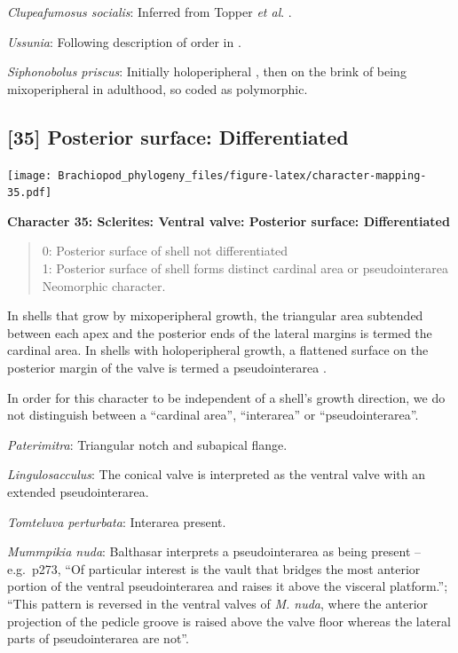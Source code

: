 \documentclass[openany]{book}
\theoremstyle{definition}
\theoremstyle{definition}
\theoremstyle{definition}
\theoremstyle{remark}
\begin{document}
\emph{Clupeafumosus socialis}: Inferred from Topper \emph{et al}.
\citeyearpar{Topper2013Reappraisalof}.

\emph{Ussunia}: Following description of order in
\citet{Williams2000BrachiopodaLinguliformea}.

\emph{Siphonobolus priscus}: Initially holoperipheral
\citep[p.~159]{Popov2009Earlyontogeny}, then on the brink of being
mixoperipheral in adulthood, so coded as polymorphic.

\hypertarget{posterior-surface-differentiated-1}{%
\subsection*{{[}35{]} Posterior surface:
Differentiated}\label{posterior-surface-differentiated-1}}

\texttt{[image: Brachiopod\_phylogeny\_files/figure-latex/character-mapping-35.pdf]}

\textbf{Character 35: Sclerites: Ventral valve: Posterior surface:
Differentiated}

\begin{quote}
0: Posterior surface of shell not differentiated\\
1: Posterior surface of shell forms distinct cardinal area or
pseudointerarea\\
Neomorphic character.
\end{quote}

In shells that grow by mixoperipheral growth, the triangular area
subtended between each apex and the posterior ends of the lateral
margins is termed the cardinal area. In shells with holoperipheral
growth, a flattened surface on the posterior margin of the valve is
termed a pseudointerarea
\citep[paraphrasing][]{Williams1997BrachiopodaRevised}.

In order for this character to be independent of a shell's growth
direction, we do not distinguish between a ``cardinal area'',
``interarea'' or ``pseudointerarea''.

\emph{Paterimitra}: Triangular notch and subapical flange.

\emph{Lingulosacculus}: The conical valve is interpreted as the ventral
valve with an extended pseudointerarea.

\emph{Tomteluva perturbata}: Interarea present.

\emph{Mummpikia nuda}: Balthasar \citeyearpar{Balthasar2008iMummpikia}
interprets a pseudointerarea as being present -- e.g.~p273, ``Of
particular interest is the vault that bridges the most anterior portion
of the ventral pseudointerarea and raises it above the visceral
platform.''; ``This pattern is reversed in the ventral valves of
\emph{M. nuda}, where the anterior projection of the pedicle groove is
raised above the valve floor whereas the lateral parts of
pseudointerarea are not''.
\end{document}
